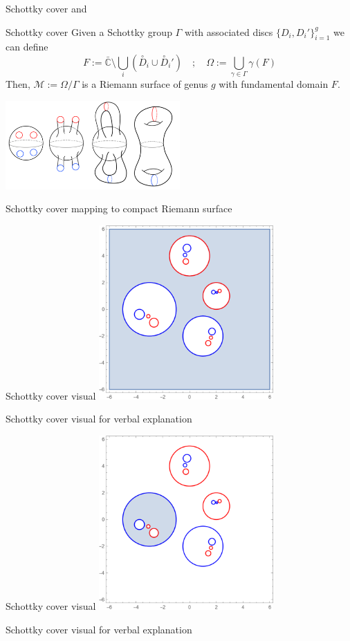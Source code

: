 \documentclass[11pt,aspectratio=169]{beamer}
\begin{document}
\begin{frame}{Schottky cover}{\tiny \cite{ComputationalSchottky} and \cite{Cha22}}
    \begin{block}{Schottky cover}
        Given a Schottky group $\Gamma$ with associated discs $\{D_i,D_i'\}_{i=1}^g$ we can define
        \[F := \bar {\mathbb C} \setminus \bigcup_i (\overset{\circ}{D}_i \cup \overset{\circ}{D}_i') \quad ; \quad \Omega := \bigcup_{\gamma \in \Gamma} \gamma(F)\]
        Then, $\mathcal M := \Omega / \Gamma$ is a Riemann surface of genus $g$ with fundamental domain $F$.
    \end{block}
    \center{}
    \includegraphics[width=0.5\textwidth]{assets/ChanSchottkyCover.png}

    \tiny Schottky cover mapping to compact Riemann surface

    \cite{Cha22}
\end{frame}

\begin{frame}{Schottky cover visual}
    \center{}
    \includegraphics[width=0.5\textwidth]{assets/Genus2SchottkyOuter.png}

    \tiny Schottky cover visual for verbal explanation
\end{frame}

\begin{frame}[noframenumbering]{Schottky cover visual}
    \center{}
    \includegraphics[width=0.5\textwidth]{assets/Genus2SchottkyInner.png}

    \tiny Schottky cover visual for verbal explanation
\end{frame}
\end{document}
